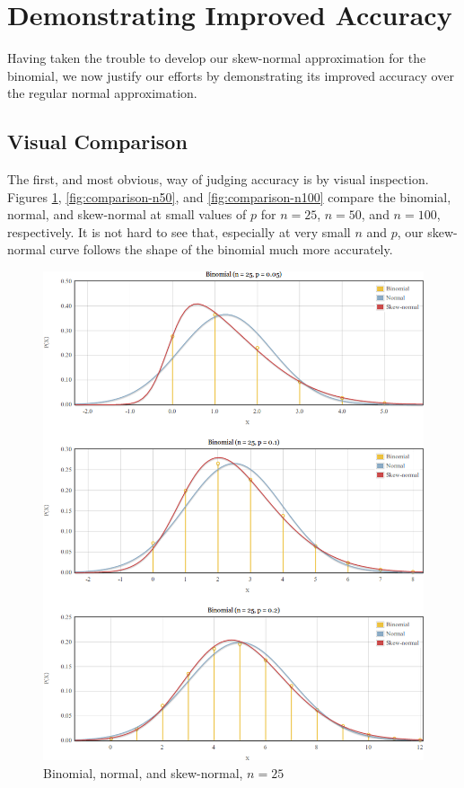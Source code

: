 \documentclass{article}
\begin{document}
\section{Demonstrating Improved Accuracy}

Having taken the trouble to develop our skew-normal approximation for the
binomial, we now justify our efforts by demonstrating its improved accuracy
over the regular normal approximation.

\subsection{Visual Comparison}

The first, and most obvious, way of judging accuracy is by visual inspection.
Figures \ref{fig:comparison-n25}, \ref{fig:comparison-n50}, and
\ref{fig:comparison-n100} compare the binomial, normal, and skew-normal at
small values of $p$ for $n=25$, $n=50$, and $n=100$, respectively. It is not
hard to see that, especially at very small $n$ and $p$, our skew-normal curve
follows the shape of the binomial much more accurately.

\begin{figure}
  \centering
  \includegraphics[width=\textwidth]{../graphs/images/comparison-n25.png}
  \caption{Binomial, normal, and skew-normal, $n=25$}
  \label{fig:comparison-n25}
\end{figure}
\end{document}
